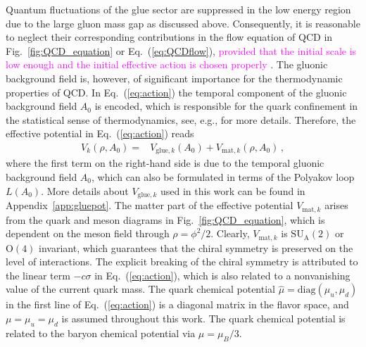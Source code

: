\documentclass[%
reprint,
superscriptaddress,
showpacs,preprintnumbers,
 amsmath,amssymb,
 aps,
prd,
]{revtex4-1}
\def\Fig#1{Fig.~\ref{#1}} \def\Tab#1{Tab.~\ref{#1}}
\def\Eq#1{Eq.~(\ref{#1})}
\def\app#1{Appendix~\ref{#1}}
\newcommand{\colfab}[1]{\textcolor{magenta}{#1}}
\begin{document}
Quantum fluctuations of the glue sector are suppressed in the low energy region due to the large gluon mass gap as discussed above. Consequently, it is reasonable to neglect their corresponding contributions in the flow equation of QCD in \Fig{fig:QCD_equation} or \Eq{eq:QCDflow}, \colfab{provided that the initial scale is low enough and the initial effective action is chosen properly \cite{Rennecke:2015lur, Springer:2016cji, Alkofer:2018guy, Fu:2019hdw}}. The gluonic background field is, however, of significant importance for the thermodynamic properties of QCD. In \Eq{eq:action} the temporal component of the gluonic background field $A_0$ is encoded, which is responsible for the quark confinement in the statistical sense of thermodynamics, see, e.g., \cite{Fukushima:2003fw,Ratti:2005jh,Schaefer:2007pw,Fu:2007xc} for more details. Therefore, the effective potential in \Eq{eq:action} reads
%
\begin{align}
V_k(\rho,A_0)=&V_{\mathrm{glue},k}(A_0)+V_{\mathrm{mat},k}(\rho,A_0)\,,\label{eq:Vtotal}
\end{align}
%
where the first term on the right-hand side is due to the temporal gluonic background field $A_0$, which can also be formulated in terms of the Polyakov loop $L(A_0)$. More details about $V_{\mathrm{glue},k}$ used in this work can be found in \app{app:gluepot}. The matter part of the effective potential $V_{\mathrm{mat},k}$ arises from the quark and meson diagrams in \Fig{fig:QCD_equation}, which is dependent on the meson field through $\rho=\phi^2/2$. Clearly,   $V_{\mathrm{mat},k}$ is $\mathrm{SU_A}(2)$ or $\mathrm{O}(4)$ invariant, which guarantees that the chiral symmetry is preserved on the level of interactions. The explicit breaking of the chiral symmetry is attributed to the linear term $-c\sigma$ in \Eq{eq:action}, which is also related to a nonvanishing value of the current quark mass. The quark chemical potential $\hat\mu=\mathrm{diag}(\mu_u,\mu_d)$ in the first line of \Eq{eq:action} is a diagonal matrix in the flavor space, and $\mu=\mu_u=\mu_d$ is assumed throughout this work. The quark chemical potential is related to the baryon chemical potential via $\mu=\mu_B/3$.
\end{document}
